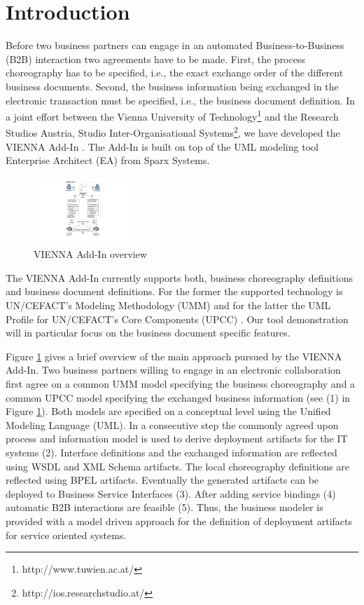 \documentclass{acm_proc_article-sp}
\begin{document}
\section{Introduction}
Before two business partners can engage in an automated Business-to-Business (B2B) interaction two agreements have to be made. First, the process choreography has to be specified, i.e., the exact exchange order of the different business documents. Second, the business information being exchanged in the electronic transaction must be specified, i.e., the business document definition. In a joint effort between the Vienna University of Technology\footnote{http://www.tuwien.ac.at/} and the Research Studios Austria, Studio Inter-Organisational Systems\footnote{http://ios.researchstudio.at/}, we have developed the VIENNA Add-In \cite{man:VIENNAAddIn}. The Add-In is built on top of the UML modeling tool Enterprise Architect (EA) from Sparx Systems. %
\begin{figure}
 \centering
   \includegraphics[width=0.32\textwidth]{figures/addinoverview.pdf}
 \caption{VIENNA Add-In overview}
 \label{fig:viennaaddinoverview}
\end{figure}
The VIENNA Add-In currently supports both, business choreography definitions and business document definitions. For the former the supported technology is UN/CEFACT's Modeling Methodology (UMM) \cite{man:umm2} and for the latter the UML Profile for UN/CEFACT's Core Components (UPCC) \cite{man:upcc}. Our tool demonstration will in particular focus on the business document specific features. 

Figure \ref{fig:viennaaddinoverview} gives a brief overview of the main approach pursued by the VIENNA Add-In. Two business partners willing to engage in an electronic collaboration first agree on a common UMM model specifying the business choreography and a common UPCC model specifying the exchanged business information (see (1) in Figure \ref{fig:viennaaddinoverview}). Both models are specified on a conceptual level using the Unified Modeling Language (UML). In a consecutive step the commonly agreed upon process and information model is used to derive deployment artifacts for the IT systems (2). Interface definitions and the exchanged information are reflected using WSDL and XML Schema artifacts. The local choreography definitions are reflected using BPEL artifacts. Eventually the generated artifacts can be deployed to Business Service Interfaces (3). After adding service bindings (4) automatic B2B interactions are feasible (5). Thus, the business modeler is provided with a model driven approach for the definition of deployment artifacts for service oriented systems.
\end{document}
